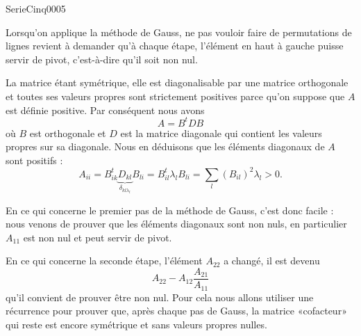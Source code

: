 
\begin{corrige}{SerieCinq0005}

	Lorsqu'on applique la méthode de Gauss, ne pas vouloir faire de permutations de lignes revient à demander qu'à chaque étape, l'élément en haut à gauche puisse servir de pivot, c'est-à-dire qu'il soit non nul.

	La matrice étant symétrique, elle est diagonalisable par une matrice orthogonale et toutes ses valeurs propres sont strictement positives parce qu'on suppose que $A$ est définie positive. Par conséquent nous avons
	\begin{equation}
		A=B^tDB
	\end{equation}
	où $B$ est orthogonale et $D$ est la matrice diagonale qui contient les valeurs propres sur sa diagonale. Nous en déduisons que les éléments diagonaux de $A$ sont positifs :
	\begin{equation}
		A_{ii}=B^t_{ik}\underbrace{D_{kl}}_{\delta_{kl\lambda_l}}B_{li}=B^t_{il}\lambda_lB_{li}=\sum_l(B_{il})^2\lambda_l>0.
	\end{equation}
	
	En ce qui concerne le premier pas de la méthode de Gauss, c'est donc facile : nous venons de prouver que les éléments diagonaux sont non nuls, en particulier $A_{11}$ est non nul et peut servir de pivot. 
	
	En ce qui concerne la seconde étape, l'élément $A_{22}$ a changé, il est devenu
	\begin{equation}	\label{EqCCnouvelhg}
		A_{22}-A_{12}\frac{ A_{21} }{ A_{11} }
	\end{equation}
	qu'il convient de prouver être non nul. Pour cela nous allons utiliser une récurrence pour prouver que, après chaque pas de Gauss, la matrice «cofacteur» qui reste est encore symétrique et sans valeurs propres nulles.


\end{corrige}
